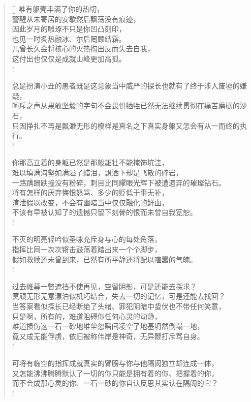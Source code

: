 \documentclass[UTF8, 12pt, a4paper]{ctexrep} %
\begin{document}
\begin{verse}[\versewidth]
唯有躯壳丰满了你的热切，\\
警醒从未寄居的安歇然后飘荡没有痕迹，\\
因此岁月的雕琢不只是你凹凸刻印，\\
也见一时炙热融冰、尔后罔顾结霜。\\
几曾长久会将核心的火热掏出反而失去自我，\\
这付出也仅仅是成就山峰更加高孤。\\!

总是扮演小丑的愚者既是这意象当中威严的探长也就有了终于涉入废墟的嫌疑，\\
呵斥之声从果敢坚毅的字句不会畏惧牺牲已然无法继续贯彻在痛苦磨砺的沙石，\\
只因挣扎不再是飘渺无形的模样是真名之下真实身躯又怎会有从一而终的执行。\\!

你那高立着的身躯已然是那般雄壮不能掩饰坑洼，\\
难以填满沟壑如满溢了蜡泪，飘洒下却是飞散的碎岩，\\
一路蹒跚跌撞没有粉碎，刺目比同耀眼光辉下被遭遗弃的璀璨钻石。\\
将有怎样的厌弃悔恨怒骂、多少的贬低于事无补，\\
渲泄假以改变，不会有幽暗当中仅仅融化的鲜血，\\
不该有早被认知了的遗憾只留下刻骨的恨而未曾自我宽恕。\\!

不灭的明亮轻吟似圣咏充斥身与心的每处角落，\\
指挥比同一次次锵击鼓荡着踏出来一个个脚步，\\
假如救赎还未曾到来，已然有所平静还将配以喧嚣的气魄。\\!

过去帷幕一瞥遮挡不使再见，空留阴影，可是还能去探求？\\
冥顽无形无意漂泊似机巧结合，失去一切的记忆，可是还能去找回？\\
当答案看似探长已经断绝了头绪、罪犯阴暗中蛰伏也不带任何笑意，\\
只是啊，所有的，难道阻碍你任何心灵的动静，\\
难道损伤这一石一砂地堆垒忽瞬间凌空了地基坍然倒塌一地，\\
竟又成无能俘虏，依旧被称伟岸是神奇，无异鞭打斥骂自身。\\!

可将有临空的指挥成就真实的臂膀与你与他隔阂独立却连成一体，\\
又怎能沸沸腾腾默认了一切的你只能是拥有着的你、把握着的你，\\
而不会成那心灵的你、一石一砂的你自认反思其实认在隔阂的它？\\!

\end{verse}
\end{document}
